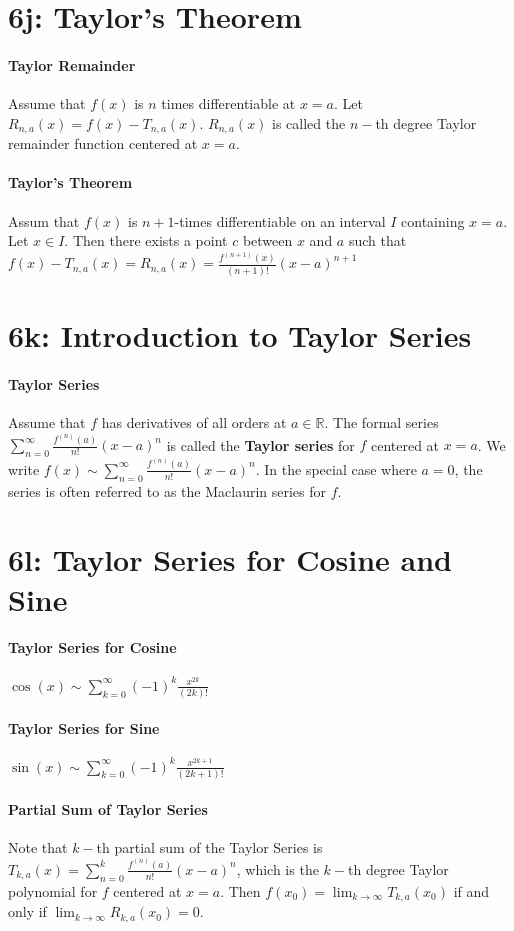 \documentclass[10pt,letter]{article}
\begin{document}
\section*{6j: Taylor's Theorem}
\paragraph{Taylor Remainder}
Assume that $f(x)$ is $n$ times differentiable at $x=a$. Let $R_{n,a}(x)=f(x)-T_{n,a}(x)$. $R_{n,a}(x)$ is called the $n-$th degree Taylor remainder function centered at $x=a$. 
\paragraph{Taylor's Theorem}
Assum that $f(x)$ is $n+1$-times differentiable on an interval $I$ containing $x=a$. Let $x\in I$. Then there exists a point $c$ between $x$ and $a$ such that $f(x)-T_{n,a}(x)=R_{n,a}(x)=\frac{f^{(n+1)}(x)}{(n+1)!}(x-a)^{n+1}$


\section*{6k: Introduction to Taylor Series}
\paragraph{Taylor Series}
Assume that $f$ has derivatives of all orders at $a\in \mathbb{R}$. The formal series $\sum_{n=0}^\infty\frac{f^{(n)}(a)}{n!}(x-a)^n$ is called the \textbf{Taylor series} for $f$ centered at $x=a$. We write $f(x)\sim\sum_{n=0}^\infty\frac{f^{(n)}(a)}{n!}(x-a)^n$. In the special case where $a=0$, the series is often referred to as the Maclaurin series for $f$. 

\section*{6l: Taylor Series for Cosine and Sine}
\paragraph{Taylor Series for Cosine}
$\cos(x)\sim\sum_{k=0}^\infty(-1)^k\frac{x^{2k}}{(2k)!}$
\paragraph{Taylor Series for Sine}
$\sin(x)\sim\sum_{k=0}^\infty(-1)^k\frac{x^{2k+1}}{(2k+1)!}$
\paragraph{Partial Sum of Taylor Series}
Note that $k-$th partial sum of the Taylor Series is $T_{k,a}(x)=\sum_{n=0}^k\frac{f^{(n)}(a)}{n!}(x-a)^n$, which is the $k-$th degree Taylor polynomial for $f$ centered at $x=a$. Then $f(x_0)=\lim_{k\rightarrow\infty}T_{k,a}(x_0)$ if and only if $\lim_{k\rightarrow\infty}R_{k,a}(x_0)=0$. 
\end{document}

